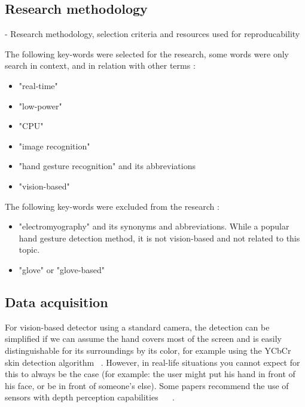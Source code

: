 \documentclass[12pt]{article}
\begin{document}
  \subsection{Research methodology}

  - Research methodology, selection criteria and resources used for reproducability

  The following key-words were selected for the research, some words were only search in context, and in relation with other terms :
  \begin{itemize}
    \item "real-time"
    \item "low-power"
    \item "CPU"
    \item "image recognition"
    \item "hand gesture recognition" and its abbreviations
    \item "vision-based"
  \end{itemize}

  The following key-words were excluded from the research :
  \begin{itemize}
    \item "electromyography" and its synonyms and abbreviations. While a popular hand gesture detection method, it is not vision-based and not related to this topic.
    \item "glove" or "glove-based"
  \end{itemize}

  \subsection{Data acquisition}

  For vision-based detector using a standard camera, the detection can be simplified if we can assume the hand covers most of the screen and is easily distinguishable for its surroundings by its color, for example using the YCbCr skin detection algorithm ~\cite{AIBINU20121183}.
  However, in real-life situations you cannot expect for this to always be the case (for example: the user might put his hand in front of his face, or be in front of someone's else). Some papers recommend the use of sensors with depth perception capabilities ~\cite{sahoo2022real} ~\cite{qi2024computer}.
\end{document}
